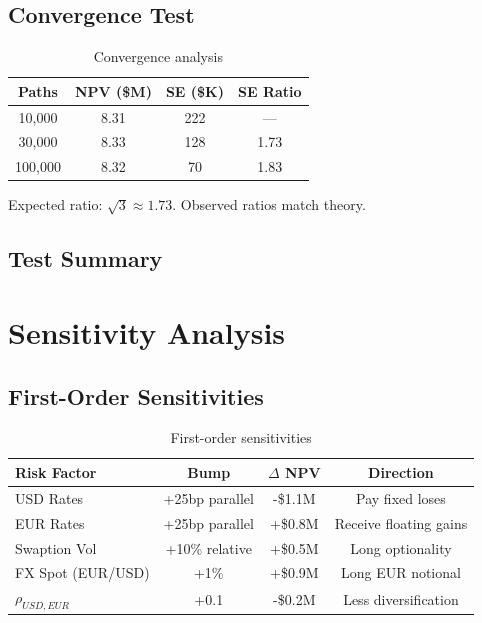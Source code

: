 \documentclass[10pt,a4paper]{article}
\begin{document}
\subsection{Convergence Test}

\begin{table}[H]
\centering
\begin{tabular}{cccc}
\toprule
\textbf{Paths} & \textbf{NPV (\$M)} & \textbf{SE (\$K)} & \textbf{SE Ratio} \\
\midrule
10,000 & 8.31 & 222 & --- \\
30,000 & 8.33 & 128 & 1.73 \\
100,000 & 8.32 & 70 & 1.83 \\
\bottomrule
\end{tabular}
\caption{Convergence analysis}
\end{table}

Expected ratio: $\sqrt{3} \approx 1.73$. Observed ratios match theory.

\subsection{Test Summary}

\begin{center}
\end{center}

\newpage

\section{Sensitivity Analysis}

\subsection{First-Order Sensitivities}

\begin{table}[H]
\centering
\begin{tabular}{lccc}
\toprule
\textbf{Risk Factor} & \textbf{Bump} & \textbf{$\Delta$ NPV} & \textbf{Direction} \\
\midrule
USD Rates & +25bp parallel & -\$1.1M & Pay fixed loses \\
EUR Rates & +25bp parallel & +\$0.8M & Receive floating gains \\
Swaption Vol & +10\% relative & +\$0.5M & Long optionality \\
FX Spot (EUR/USD) & +1\% & +\$0.9M & Long EUR notional \\
$\rho_{USD,EUR}$ & +0.1 & -\$0.2M & Less diversification \\
\bottomrule
\end{tabular}
\caption{First-order sensitivities}
\end{table}
\end{document}
